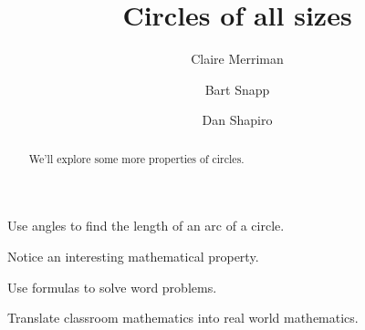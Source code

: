 \documentclass[noauthor,hints,nooutcomes,handout,12pt]{ximera}
\title{Circles of all sizes}
\author{Claire Merriman \and Bart Snapp \and Dan Shapiro}
\begin{document}
\begin{abstract}
  We'll explore some more properties of circles.
\end{abstract}
\maketitle

\begin{listOutcomes}
\item Use angles to find the length of an arc of a circle.
\item Notice an interesting mathematical property.
\item Use formulas to solve word problems.
\item Translate classroom mathematics into real world mathematics. 
\end{listOutcomes}



\mynewpage



\mynewpage
\end{document}

